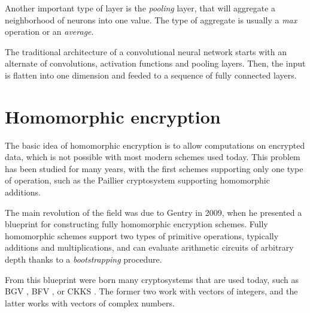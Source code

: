 \documentclass[a4paper,11pt,oneside]{report}
\begin{document}
Another important type of layer is the \emph{pooling} layer, that will aggregate a neighborhood of neurons into one value. 
The type of aggregate is usually a \emph{max} operation or an \emph{average}.

The traditional architecture of a convolutional neural network starts with an alternate of convolutions, activation functions and pooling layers. 
Then, the input is flatten into one dimension and feeded to a sequence of fully connected layers.


\section{Homomorphic encryption}

The basic idea of homomorphic encryption is to allow computations on encrypted data, which is not possible with most modern schemes used today. 
This problem has been studied for many years, with the first schemes supporting only one type of operation, such as the Paillier \cite{paillier_public-key_1999} cryptosystem supporting homomorphic additions. 

The main revolution of the field was due to Gentry \cite{gentry_fully_2009} in 2009, when he presented a blueprint for constructing fully homomorphic encryption schemes. 
Fully homomorphic schemes support two types of primitive operations, typically additions and multiplications, and can evaluate arithmetic circuits of arbitrary depth thanks to a \emph{bootstrapping} procedure.

From this blueprint were born many cryptosystems that are used today, such as BGV \cite{brakerski_leveled_2012}, BFV \cite{fan_somewhat_2012}, or CKKS \cite{cheon_homomorphic_2016, cheon_full_2018}. 
The former two work with vectors of integers, and the latter works with vectors of complex numbers.
\end{document}
